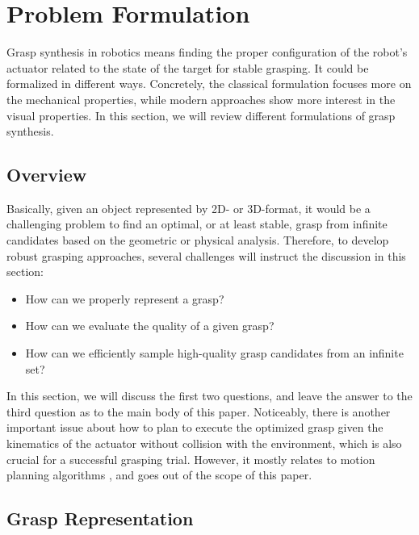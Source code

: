 \documentclass[letterpaper,10pt]{article}
\begin{document}


\section{Problem Formulation}
\label{sec:formulation}

Grasp synthesis in robotics means finding the proper configuration of the robot's actuator related to the state of the target for stable grasping.
It could be formalized in different ways.
Concretely, the classical formulation focuses more on the mechanical properties, while modern approaches show more interest in the visual properties.
In this section, we will review different formulations of grasp synthesis.

\subsection{Overview}
Basically, given an object represented by 2D- or 3D-format, it would be a challenging problem to find an optimal, or at least stable, grasp from infinite candidates based on the geometric or physical analysis.
Therefore, to develop robust grasping approaches, several challenges will instruct the discussion in this section:
\begin{itemize}
	\item How can we properly represent a grasp?
	\item How can we evaluate the quality of a given grasp?
	\item How can we efficiently sample high-quality grasp candidates from an infinite set?
\end{itemize}
In this section, we will discuss the first two questions, and leave the answer to the third question as to the main body of this paper. Noticeably, there is another important issue about how to plan to execute the optimized grasp given the kinematics of the actuator without collision with the environment, which is also crucial for a successful grasping trial. However, it mostly relates to motion planning algorithms \cite{lavalle2006planning}, and goes out of the scope of this paper.

\subsection{Grasp Representation}
\end{document}
